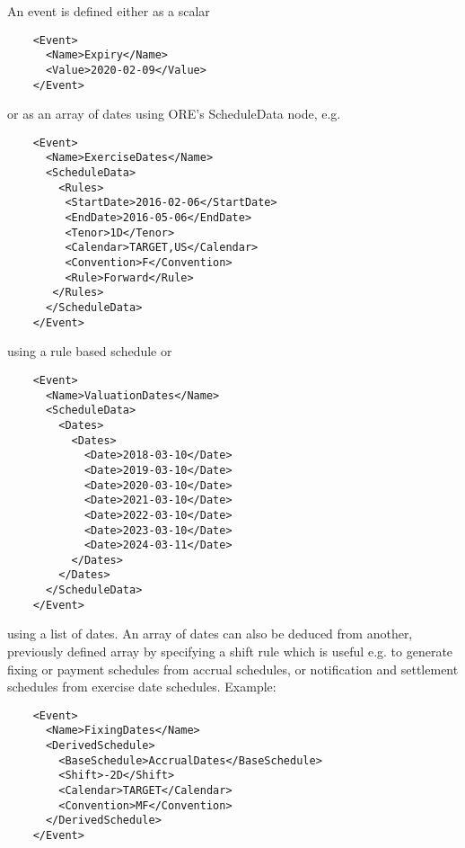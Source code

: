 An event is defined either as a scalar

\begin{verbatim}
    <Event>
      <Name>Expiry</Name>
      <Value>2020-02-09</Value>
    </Event>
\end{verbatim}

or as an array of dates using ORE's ScheduleData node, e.g.

\begin{verbatim}
    <Event>
      <Name>ExerciseDates</Name>
      <ScheduleData>
        <Rules>
         <StartDate>2016-02-06</StartDate>
         <EndDate>2016-05-06</EndDate>
         <Tenor>1D</Tenor>
         <Calendar>TARGET,US</Calendar>
         <Convention>F</Convention>
         <Rule>Forward</Rule>
       </Rules>
      </ScheduleData>
    </Event>
\end{verbatim}

using a rule based schedule or

\begin{verbatim}
    <Event>
      <Name>ValuationDates</Name>
      <ScheduleData>
        <Dates>
          <Dates>
            <Date>2018-03-10</Date>
            <Date>2019-03-10</Date>
            <Date>2020-03-10</Date>
            <Date>2021-03-10</Date>
            <Date>2022-03-10</Date>
            <Date>2023-03-10</Date>
            <Date>2024-03-11</Date>
          </Dates>
        </Dates>
      </ScheduleData>
    </Event>
\end{verbatim}

using a list of dates. An array of dates can also be deduced from another, previously defined array by specifying a
shift rule which is useful e.g. to generate fixing or payment schedules from accrual schedules, or notification and
settlement schedules from exercise date schedules. Example:

\begin{verbatim}
    <Event>
      <Name>FixingDates</Name>
      <DerivedSchedule>
        <BaseSchedule>AccrualDates</BaseSchedule>
        <Shift>-2D</Shift>
        <Calendar>TARGET</Calendar>
        <Convention>MF</Convention>
      </DerivedSchedule>
    </Event>
\end{verbatim}
